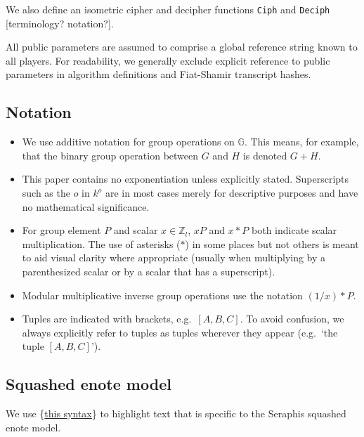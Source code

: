 We also define an isometric cipher and decipher functions {\tt Ciph} and {\tt Deciph} [terminology? notation?].

All public parameters are assumed to comprise a global reference string known to all players. For readability, we generally exclude explicit reference to public parameters in algorithm definitions and Fiat-Shamir transcript hashes.


\subsection{Notation}
\label{subsec:preliminaries-notation}

\begin{itemize}
    \item We use additive notation for group operations on $\mathbb{G}$. This means, for example, that the binary group operation between $G$ and $H$ is denoted $G + H$.

    \item This paper contains no exponentiation unless explicitly stated. Superscripts such as the $o$ in $k^o$ are in most cases merely for descriptive purposes and have no mathematical significance.

    \item For group element $P$ and scalar $x \in \mathbb{Z}_l$, $x P$ and $x*P$ both indicate scalar multiplication. The use of asterisks ($*$) in some places but not others is meant to aid visual clarity where appropriate (usually when multiplying by a parenthesized scalar or by a scalar that has a superscript).

    \item Modular multiplicative inverse group operations use the notation $(1/x)*P$.

    \item Tuples are indicated with brackets, e.g.\ $[A, B, C]$. To avoid confusion, we always explicitly refer to tuples as tuples wherever they appear (e.g.\ `the tuple $[A, B, C]$').
\end{itemize}


\subsection{Squashed enote model}
\label{subsec:preliminaries-squashed-enote-model}

We use \{\ul{this syntax}\} to highlight text that is specific to the Seraphis squashed enote model.



